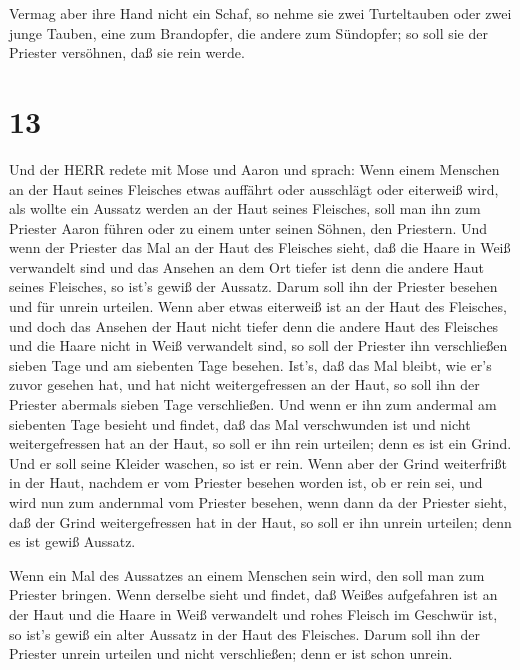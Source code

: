  Vermag aber ihre Hand nicht ein Schaf, so nehme sie zwei
Turteltauben oder zwei junge Tauben, eine zum Brandopfer, die andere zum
Sündopfer; so soll sie der Priester versöhnen, daß sie rein werde.

\hypertarget{section-12}{%
\section{13}\label{section-12}}

 Und der HERR redete mit Mose und Aaron und sprach:
 Wenn einem Menschen an der Haut seines Fleisches etwas
auffährt oder ausschlägt oder eiterweiß wird, als wollte ein Aussatz
werden an der Haut seines Fleisches, soll man ihn zum Priester Aaron
führen oder zu einem unter seinen Söhnen, den Priestern. 
Und wenn der Priester das Mal an der Haut des Fleisches sieht, daß die
Haare in Weiß verwandelt sind und das Ansehen an dem Ort tiefer ist denn
die andere Haut seines Fleisches, so ist's gewiß der Aussatz. Darum soll
ihn der Priester besehen und für unrein urteilen.  Wenn aber
etwas eiterweiß ist an der Haut des Fleisches, und doch das Ansehen der
Haut nicht tiefer denn die andere Haut des Fleisches und die Haare nicht
in Weiß verwandelt sind, so soll der Priester ihn verschließen sieben
Tage  und am siebenten Tage besehen. Ist's, daß das Mal
bleibt, wie er's zuvor gesehen hat, und hat nicht weitergefressen an der
Haut,  so soll ihn der Priester abermals sieben Tage
verschließen. Und wenn er ihn zum andermal am siebenten Tage besieht und
findet, daß das Mal verschwunden ist und nicht weitergefressen hat an
der Haut, so soll er ihn rein urteilen; denn es ist ein Grind. Und er
soll seine Kleider waschen, so ist er rein.  Wenn aber der
Grind weiterfrißt in der Haut, nachdem er vom Priester besehen worden
ist, ob er rein sei, und wird nun zum andernmal vom Priester besehen,
 wenn dann da der Priester sieht, daß der Grind
weitergefressen hat in der Haut, so soll er ihn unrein urteilen; denn es
ist gewiß Aussatz.

 Wenn ein Mal des Aussatzes an einem Menschen sein wird, den
soll man zum Priester bringen.  Wenn derselbe sieht und
findet, daß Weißes aufgefahren ist an der Haut und die Haare in Weiß
verwandelt und rohes Fleisch im Geschwür ist,  so ist's
gewiß ein alter Aussatz in der Haut des Fleisches. Darum soll ihn der
Priester unrein urteilen und nicht verschließen; denn er ist schon
unrein.

